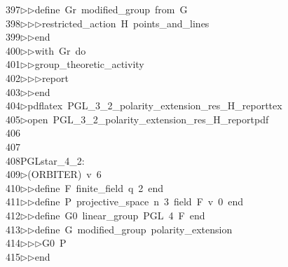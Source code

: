 \begin{tabbing}
397\>$\triangleright$\>$\triangleright$\>define\ Gr\ modified\_group\ from\ G\ \\[0pt]
398\>$\triangleright$\>$\triangleright$\>$\triangleright$\>restricted\_action\ H\ points\_and\_lines\ \\[0pt]
399\>$\triangleright$\>$\triangleright$\>end\ \\[0pt]
400\>$\triangleright$\>$\triangleright$\>with\ Gr\ do\ \\[0pt]
401\>$\triangleright$\>$\triangleright$\>group\_theoretic\_activity\ \\[0pt]
402\>$\triangleright$\>$\triangleright$\>$\triangleright$\>report\ \\[0pt]
403\>$\triangleright$\>$\triangleright$\>end\\[0pt]
404\>$\triangleright$\>pdflatex\ PGL\_3\_2\_polarity\_extension\_res\_H\_reporttex\\[0pt]
405\>$\triangleright$\>open\ PGL\_3\_2\_polarity\_extension\_res\_H\_reportpdf\\[0pt]
406\>\\[0pt]
407\>\\[0pt]
408\>PGLstar\_4\_2:\\[0pt]
409\>$\triangleright$\>(ORBITER)\ v\ 6\ \\[0pt]
410\>$\triangleright$\>$\triangleright$\>define\ F\ finite\_field\ q\ 2\ end\ \\[0pt]
411\>$\triangleright$\>$\triangleright$\>define\ P\ projective\_space\ n\ 3\ field\ F\ v\ 0\ end\ \\[0pt]
412\>$\triangleright$\>$\triangleright$\>define\ G0\ linear\_group\ PGL\ 4\ F\ end\ \\[0pt]
413\>$\triangleright$\>$\triangleright$\>define\ G\ modified\_group\ polarity\_extension\ \\[0pt]
414\>$\triangleright$\>$\triangleright$\>$\triangleright$\>G0\ P\ \\[0pt]
415\>$\triangleright$\>$\triangleright$\>end\ \\[0pt]

\end{tabbing}

